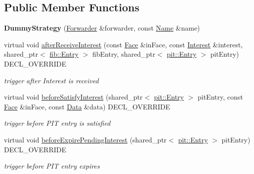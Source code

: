 \subsection*{Public Member Functions}
\begin{DoxyCompactItemize}
\item 
{\bfseries Dummy\+Strategy} (\hyperlink{classnfd_1_1Forwarder}{Forwarder} \&forwarder, const \hyperlink{classndn_1_1Name}{Name} \&name)\hypertarget{classnfd_1_1tests_1_1DummyStrategy_aa4646cfe0a0316943981d6724fce92a2}{}\label{classnfd_1_1tests_1_1DummyStrategy_aa4646cfe0a0316943981d6724fce92a2}

\item 
virtual void \hyperlink{classnfd_1_1tests_1_1DummyStrategy_aa558372004fd24efc2debd5e329e2af9}{after\+Receive\+Interest} (const \hyperlink{classnfd_1_1Face}{Face} \&in\+Face, const \hyperlink{classndn_1_1Interest}{Interest} \&interest, shared\+\_\+ptr$<$ \hyperlink{classnfd_1_1fib_1_1Entry}{fib\+::\+Entry} $>$ fib\+Entry, shared\+\_\+ptr$<$ \hyperlink{classnfd_1_1pit_1_1Entry}{pit\+::\+Entry} $>$ pit\+Entry) D\+E\+C\+L\+\_\+\+O\+V\+E\+R\+R\+I\+DE
\begin{DoxyCompactList}\small\item\em trigger after Interest is received \end{DoxyCompactList}\item 
virtual void \hyperlink{classnfd_1_1tests_1_1DummyStrategy_aaa64a53e1d477130169e8b6c1223696d}{before\+Satisfy\+Interest} (shared\+\_\+ptr$<$ \hyperlink{classnfd_1_1pit_1_1Entry}{pit\+::\+Entry} $>$ pit\+Entry, const \hyperlink{classnfd_1_1Face}{Face} \&in\+Face, const \hyperlink{classndn_1_1Data}{Data} \&data) D\+E\+C\+L\+\_\+\+O\+V\+E\+R\+R\+I\+DE
\begin{DoxyCompactList}\small\item\em trigger before P\+IT entry is satisfied \end{DoxyCompactList}\item 
virtual void \hyperlink{classnfd_1_1tests_1_1DummyStrategy_a60fed292ba565ee25f0f6524aa941760}{before\+Expire\+Pending\+Interest} (shared\+\_\+ptr$<$ \hyperlink{classnfd_1_1pit_1_1Entry}{pit\+::\+Entry} $>$ pit\+Entry) D\+E\+C\+L\+\_\+\+O\+V\+E\+R\+R\+I\+DE
\begin{DoxyCompactList}\small\item\em trigger before P\+IT entry expires \end{DoxyCompactList}\end{DoxyCompactItemize}
